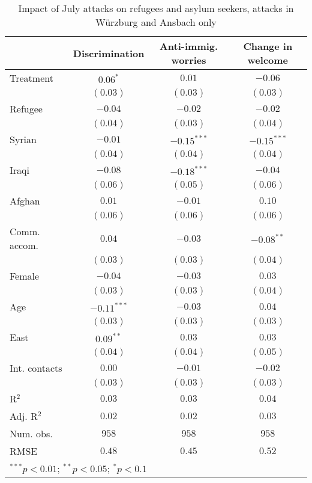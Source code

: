 
\begin{table}
\caption{Impact of July attacks on refugees and asylum seekers, attacks in Würzburg and Ansbach only}
\begin{center}
\begin{tabular}{l c c c}
\toprule
 & Discrimination & Anti-immig. worries & Change in welcome \\
\midrule
Treatment     & $0.06^{*}$    & $0.01$        & $-0.06$       \\
              & $(0.03)$      & $(0.03)$      & $(0.03)$      \\
Refugee       & $-0.04$       & $-0.02$       & $-0.02$       \\
              & $(0.04)$      & $(0.03)$      & $(0.04)$      \\
Syrian        & $-0.01$       & $-0.15^{***}$ & $-0.15^{***}$ \\
              & $(0.04)$      & $(0.04)$      & $(0.04)$      \\
Iraqi         & $-0.08$       & $-0.18^{***}$ & $-0.04$       \\
              & $(0.06)$      & $(0.05)$      & $(0.06)$      \\
Afghan        & $0.01$        & $-0.01$       & $0.10$        \\
              & $(0.06)$      & $(0.06)$      & $(0.06)$      \\
Comm. accom.  & $0.04$        & $-0.03$       & $-0.08^{**}$  \\
              & $(0.03)$      & $(0.03)$      & $(0.04)$      \\
Female        & $-0.04$       & $-0.03$       & $0.03$        \\
              & $(0.03)$      & $(0.03)$      & $(0.04)$      \\
Age           & $-0.11^{***}$ & $-0.03$       & $0.04$        \\
              & $(0.03)$      & $(0.03)$      & $(0.03)$      \\
East          & $0.09^{**}$   & $0.03$        & $0.03$        \\
              & $(0.04)$      & $(0.04)$      & $(0.05)$      \\
Int. contacts & $0.00$        & $-0.01$       & $-0.02$       \\
              & $(0.03)$      & $(0.03)$      & $(0.03)$      \\
\midrule
R$^2$         & $0.03$        & $0.03$        & $0.04$        \\
Adj. R$^2$    & $0.02$        & $0.02$        & $0.03$        \\
Num. obs.     & $958$         & $958$         & $958$         \\
RMSE          & $0.48$        & $0.45$        & $0.52$        \\
\bottomrule
\multicolumn{4}{l}{\scriptsize{$^{***}p<0.01$; $^{**}p<0.05$; $^{*}p<0.1$}}
\end{tabular}
\label{tab_host_no_nice}
\end{center}
\end{table}
